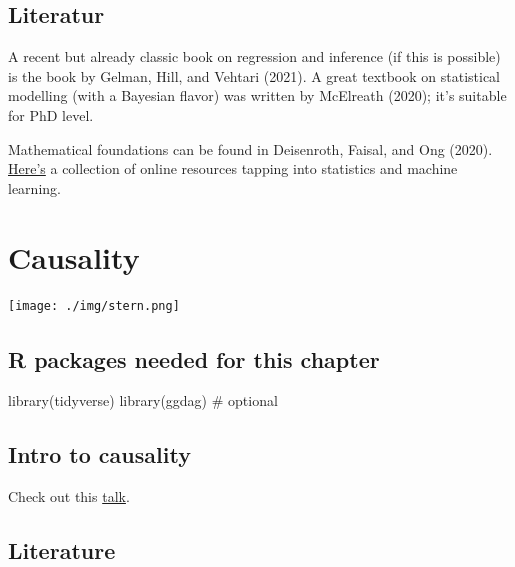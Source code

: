 \documentclass[
  letterpaper,
  DIV=11,
  numbers=noendperiod]{scrreprt}
\newenvironment{Shaded}{\begin{snugshade}}{\end{snugshade}}
\newcommand{\CommentTok}[1]{\textcolor[rgb]{0.37,0.37,0.37}{#1}}
\newcommand{\FunctionTok}[1]{\textcolor[rgb]{0.28,0.35,0.67}{#1}}
\newcommand{\NormalTok}[1]{\textcolor[rgb]{0.00,0.23,0.31}{#1}}
\theoremstyle{definition}
\theoremstyle{definition}
\theoremstyle{remark}
\begin{document}
\hypertarget{literatur}{%
\section{Literatur}\label{literatur}}

A recent but already classic book on regression and inference (if this
is possible) is the book by Gelman, Hill, and Vehtari (2021). A great
textbook on statistical modelling (with a Bayesian flavor) was written
by McElreath (2020); it's suitable for PhD level.

Mathematical foundations can be found in Deisenroth, Faisal, and Ong
(2020).
\href{https://data-se.netlify.app/2022/06/13/free-resources-for-aspiring-data-adepts/}{Here's}
a collection of online resources tapping into statistics and machine
learning.


\hypertarget{causality}{%
\chapter{Causality}\label{causality}}

\texttt{[image: ./img/stern.png]}

\hypertarget{r-packages-needed-for-this-chapter-3}{%
\section{R packages needed for this
chapter}\label{r-packages-needed-for-this-chapter-3}}

\begin{Shaded}
\begin{Highlighting}[]
\FunctionTok{library}\NormalTok{(tidyverse)}
\FunctionTok{library}\NormalTok{(ggdag)  }\CommentTok{\# optional  }
\end{Highlighting}
\end{Shaded}

\hypertarget{intro-to-causality}{%
\section{Intro to causality}\label{intro-to-causality}}

Check out this
\href{https://sebastiansauer-academic.netlify.app/uploads/Intro-to-Causality.pdf}{talk}.

\hypertarget{literature-3}{%
\section{Literature}\label{literature-3}}
\end{document}

